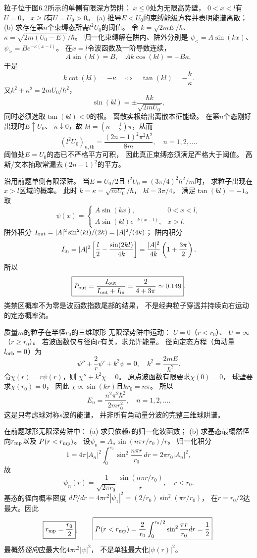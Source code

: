 粒子位于图6.2所示的单侧有限深方势阱：
$x\le0$处为无限高势壁，
$0<x<l$有$U=0$，
$x\ge l$有$U=U_0>0$。
(a) 推导$E<U_0$的束缚能级方程并表明能谱离散；
(b) 求存在第$n$个束缚态所需$l^2U_0$的阈值。
\exsolution
令
$k=\sqrt{2mE}/\hbar$、
$\kappa=\sqrt{2m(U_0-E)}/\hbar$。
归一化束缚解在阱内、阱外分别是
$\psi_<=A\sin(kx)$、
$\psi_>=B e^{-\kappa(x-l)}$。
在$x=l$令波函数及一阶导数连续，
\[
 A\sin(kl)=B,\quad
 Ak\cos(kl)=-B\kappa,
\]
于是
\[
 \boxed{k\cot(kl)=-\kappa
 \quad\Longleftrightarrow\quad \tan(kl)=-\frac k\kappa}.
\]
又$k^2+\kappa^2=2mU_0/\hbar^2$，
\[
 \boxed{\sin(kl)=\pm\frac{\hbar k}{\sqrt{2mU_0}}},
\]
同时必须选取$\tan(kl)<0$的根。
离散实根给出离散本征能级。
在第$n$个态刚好出现时$E\uparrow U_0$、
$\kappa\downarrow0$，故
$kl=(n-\tfrac12)\pi$，从而
\[
 \boxed{(l^2U_0)_{n,\mathrm{th}}=
 \frac{(2n-1)^2\pi^2\hbar^2}{8m}},
 \quad n=1,2,\dots.
\]
\excheck 阈值处$E=U_0$的态已不严格平方可积，
因此真正束缚态须满足严格大于阈值。
高斯/文本抽取常漏去$(2n-1)^2$的平方。

沿用前题单侧有限深阱。
当$E=U_0/2$且
$l^2U_0=(3\pi/4)^2\hbar^2/m$时，
求粒子出现在$x>l$区域的概率。
\exsolution
此时
$k=\kappa=\sqrt{mU_0}/\hbar$，
$kl=3\pi/4$，
满足$\tan(kl)=-1$。
取
\[
 \psi(x)=
 \begin{cases}
 A\sin(kx),&0<x<l,\\
 A\sin(kl)e^{-k(x-l)},&x>l.
 \end{cases}
\]
阱外积分
$I_{\rm out}=|A|^2\sin^2(kl)/(2k)=|A|^2/(4k)$；
阱内积分
\[
 I_{\rm in}=|A|^2
 \left[\frac l2-\frac{\sin(2kl)}{4k}\right]
 =\frac{|A|^2}{4k}\left(1+\frac{3\pi}{2}\right).
\]
所以
\[
 \boxed{P_{\rm out}=
 \frac{I_{\rm out}}{I_{\rm out}+I_{\rm in}}
 =\frac2{4+3\pi}\simeq0.149}.
\]
\excheck 类禁区概率不为零是波函数指数尾部的结果，
不是经典粒子穿透并持续向右运动的定态概率流。

质量$m$的粒子在半径$r_0$的三维球形
无限深势阱中运动：
$U=0$（$r<r_0$）、
$U=\infty$（$r\ge r_0$）。
若波函数仅与径向$r$有关，求允许能量。
\exsolution
径向定态方程（角动量$l_{\rm orb}=0$）为
\[
 \psi''+\frac2r\psi'+k^2\psi=0,\quad
 k^2=\frac{2mE}{\hbar^2}.
\]
令$\chi(r)=r\psi(r)$，则
$\chi''+k^2\chi=0$。
原点波函数有限要求$\chi(0)=0$，
球壁要求$\chi(r_0)=0$，
因此
$\chi\propto\sin(kr)$且$kr_0=n\pi$。
所以
\[
 \boxed{E_n=\frac{n^2\pi^2\hbar^2}{2mr_0^2}},
 \quad n=1,2,\dots.
\]
\excheck 这是只考虑球对称$s$波的能谱，
并非所有角动量分波的完整三维球阱谱。

在前题球形无限深势阱中：
(a) 求只依赖$r$的归一化波函数；
(b) 求基态最概然径向$r_{\rm mp}$以及
$P(r<r_{\rm mp})$。
\exsolution
设$\psi_n=A_n\sin(n\pi r/r_0)/r$。
归一化积分
\[
 1=4\pi|A_n|^2\int_0^{r_0}
 \sin^2\frac{n\pi r}{r_0}\,dr
 =2\pi r_0|A_n|^2,
\]
故
\[
 \boxed{\psi_n(r)=\frac1{\sqrt{2\pi r_0}}
 \frac{\sin(n\pi r/r_0)}r},\quad r<r_0.
\]
基态的径向概率密度
$dP/dr=4\pi r^2|\psi_1|^2
=(2/r_0)\sin^2(\pi r/r_0)$，
在$r=r_0/2$达最大。因此
\[
 \boxed{r_{\rm mp}=\frac{r_0}2},\qquad
 \boxed{P(r<r_{\rm mp})=\frac2{r_0}
 \int_0^{r_0/2}\sin^2\frac{\pi r}{r_0}dr=\frac12}.
\]
\excheck 最概然\emph{径向}应最大化$4\pi r^2|\psi|^2$，
不是单独最大化$|\psi(r)|^2$。

